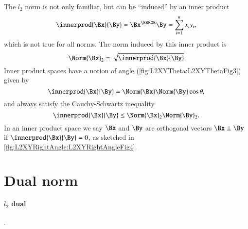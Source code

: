 The \( l_2 \) norm is not only familiar, but can be ``induced'' by an inner product
%
\begin{equation}\label{eqn:convex-optimizationLecture2:84}
\innerprod{\Bx}{\By} = \Bx^\T \By = \sum_{i = 1}^n x_i y_i,
\end{equation}
%
which is not true for all norms.  The norm induced by this inner product is
%
\begin{equation}\label{eqn:convex-optimizationLecture2:104}
\Norm{\Bx}_2 = \sqrt{ \innerprod{\Bx}{\By} }
\end{equation}
%
Inner product spaces have a notion of angle
(\cref{fig:L2XYTheta:L2XYThetaFig3})
given by
%
\begin{equation}\label{eqn:convex-optimizationLecture2:124}
\innerprod{\Bx}{\By} = \Norm{\Bx} \Norm{\By} \cos \theta,
\end{equation}
%
and always satisfy the Cauchy-Schwartz inequality
%
\begin{equation}\label{eqn:convex-optimizationLecture2:144}
\innerprod{\Bx}{\By} \le \Norm{\Bx}_2 \Norm{\By}_2.
\end{equation}
%
In an inner product space we say \( \Bx \) and \( \By \) are orthogonal vectors \( \Bx \perp \By \) if
\( \innerprod{\Bx}{\By} = 0 \), as sketched in
\cref{fig:L2XYRightAngle:L2XYRightAngleFig4}.


\section{Dual norm}


\paragraph{\( l_2 \) dual}.

